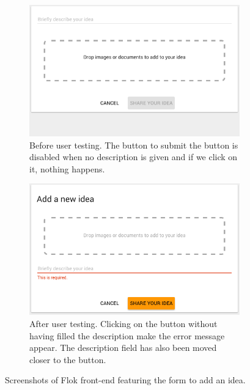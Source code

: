 \documentclass[a4paper,12pt, oneside]{article}
\begin{document}
\begin{figure}[!htb]
    \begin{subfigure}[t]{.495\textwidth}
        \includegraphics[width=\textwidth]{images/user_tests/addIdeaForm_before.png}
        \caption{Before user testing. The button to submit the button is disabled when no description is given and if we click on it, nothing happens.}
        \label{fig.tests.addIdeaForm.before}
    \end{subfigure}
    \hfill
    \begin{subfigure}[t]{.495\textwidth}
        \includegraphics[width=\textwidth]{images/user_tests/addIdeaForm_after.png}
        \caption{After user testing. Clicking on the button without having filled the description make the error message appear. The description field has also been moved closer to the button.}
        \label{fig.tests.addIdeaForm.after}
    \end{subfigure}
    \caption{Screenshots of Flok front-end featuring the form to add an idea.}
    \label{fig.tests.addIdeaForm}
\end{figure}
\end{document}
